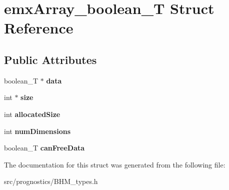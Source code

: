 \hypertarget{structemxArray__boolean__T}{}\section{emx\+Array\+\_\+boolean\+\_\+T Struct Reference}
\label{structemxArray__boolean__T}
\subsection*{Public Attributes}
\begin{DoxyCompactItemize}
\item 
\mbox{\label{structemxArray__boolean__T_a46dbac98e8def66b10d7c166326574a4}} 
boolean\+\_\+T $\ast$ {\bfseries data}
\item 
\mbox{\label{structemxArray__boolean__T_ad0ed3db7fb168fc1094fef0522ab0095}} 
int $\ast$ {\bfseries size}
\item 
\mbox{\label{structemxArray__boolean__T_a5fa0effded733cfd4d69a964ef443889}} 
int {\bfseries allocated\+Size}
\item 
\mbox{\label{structemxArray__boolean__T_ac791fb511dc68f0df4649a757f366315}} 
int {\bfseries num\+Dimensions}
\item 
\mbox{\label{structemxArray__boolean__T_a7d1ade780f051ad39c2d889169929946}} 
boolean\+\_\+T {\bfseries can\+Free\+Data}
\end{DoxyCompactItemize}


The documentation for this struct was generated from the following file\+:\begin{DoxyCompactItemize}
\item 
src/prognostics/B\+H\+M\+\_\+types.\+h\end{DoxyCompactItemize}
